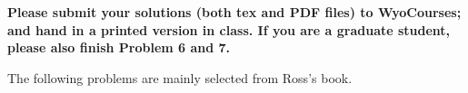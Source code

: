 \documentclass{report}
\begin{document}

\fancyhead{}
\fancyfoot{}


\newcommand{\N}{\mathbb{N}}
\newcommand{\Z}{\mathbb{Z}}
\newcommand{\Q}{\mathbb{Q}}
\newcommand{\R}{\mathbb{R}}
\newcommand{\C}{\mathbb{C}}
\newcommand{\D}{\mathbb{D}}
\newcommand{\<}{\left\langle}
\renewcommand{\>}{\right\rangle}
\renewcommand{\Re}[1]{\text{Re}\ #1}
\renewcommand{\Im}[1]{\text{Im}\ #1}
\renewcommand{\mod}[1]{(\operatorname{mod}#1)}

\noindent
{\bf Please submit your solutions (both tex and PDF files) to WyoCourses; and hand in a printed version in class. If you are a graduate student, please also finish Problem 6 and 7.}

\medskip


The following problems are mainly selected from Ross's book. 
\end{document}
